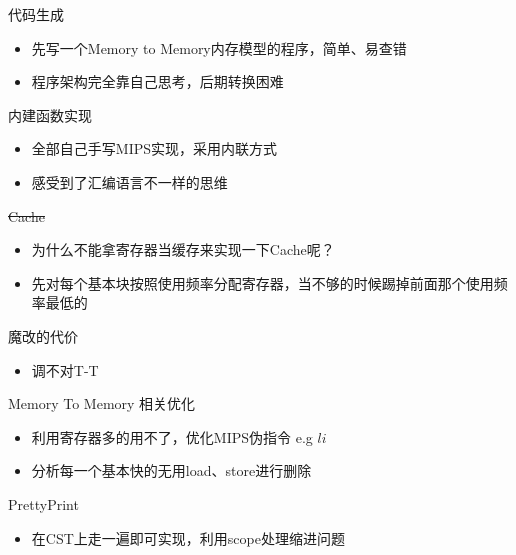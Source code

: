 \documentclass[UTF8]{beamer}
\begin{document}
\begin{frame}{代码生成}
	\begin{itemize}
	\item 先写一个Memory to Memory内存模型的程序，简单、易查错
	\item 程序架构完全靠自己思考，后期转换困难
	\end{itemize}
\end{frame}

\begin{frame}{内建函数实现}
	\begin{itemize}
	\item 全部自己手写MIPS实现，采用内联方式
	\item 感受到了汇编语言不一样的思维
	\end{itemize}
\end{frame}

\begin{frame}{\sout{Cache}}
	\begin{itemize}
	\item 为什么不能拿寄存器当缓存来实现一下Cache呢？
	\item 先对每个基本块按照使用频率分配寄存器，当不够的时候踢掉前面那个使用频率最低的
	\end{itemize}
\end{frame}

\begin{frame}{魔改的代价}
	\begin{itemize}
	\item 调不对T-T
	\end{itemize}
\end{frame}

\begin{frame}{Memory To Memory 相关优化}
	\begin{itemize}
	\item 利用寄存器多的用不了，优化MIPS伪指令 e.g $li$
	\item 分析每一个基本快的无用load、store进行删除
	\end{itemize}
\end{frame}

\begin{frame}{PrettyPrint}
	\begin{itemize}
	\item 在CST上走一遍即可实现，利用scope处理缩进问题
	\end{itemize}
\end{frame}
\end{document}
